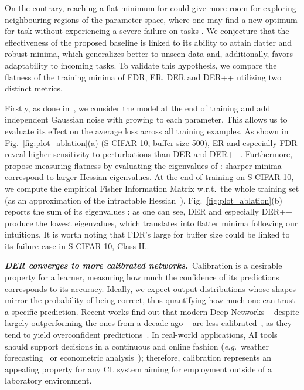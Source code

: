 \documentclass{article}
\begin{document}
On the contrary, reaching a flat minimum for  could give more room for exploring neighbouring regions of the parameter space, where one may find a new optimum for task  without experiencing a severe failure on tasks . We conjecture that the effectiveness of the proposed baseline is linked to its ability to attain flatter and robust minima, which generalizes better to unseen data and, additionally, favors adaptability to incoming tasks. To validate this hypothesis, we compare the flatness of the training minima of FDR, ER, DER and DER++ utilizing two distinct metrics.

Firstly, as done in~\cite{zhang2019your, zhang2018deep}, we consider the model at the end of training and add independent Gaussian noise with growing  to each parameter. This allows us to evaluate its effect on the average loss across all training examples. As shown in Fig.~\ref{fig:plot_ablation}(a) (S-CIFAR-10, buffer size 500), ER and especially FDR reveal higher sensitivity to perturbations than DER and DER++.
Furthermore, \cite{chaudhari2017entropy, jastrzkebski2018three, keskar2017large} propose measuring flatness by evaluating the eigenvalues of : sharper minima correspond to larger Hessian eigenvalues. At the end of training on S-CIFAR-10, we compute the empirical Fisher Information Matrix  w.r.t.\ the whole training set (as an approximation of the intractable Hessian~\cite{chaudhari2017entropy, kirkpatrick2017overcoming}). Fig.~\ref{fig:plot_ablation}(b) reports the sum of its eigenvalues : as one can see, DER and especially DER++ produce the lowest eigenvalues, which translates into flatter minima following our intuitions. It is worth noting that FDR's large  for buffer size  could be linked to its failure case in S-CIFAR-10, Class-IL.

\textbf{\textit{DER converges to more calibrated networks.}}~Calibration is a desirable property for a learner, measuring how much the confidence of its predictions corresponds to its accuracy. Ideally, we expect output distributions whose shapes mirror the probability of being correct, thus quantifying how much one can trust a specific prediction. Recent works find out that modern Deep Networks -- despite largely outperforming the ones from a decade ago -- are less calibrated~\cite{guo2017calibration}, as they tend to yield overconfident predictions~\cite{kull2019beyond}. In real-world applications, AI tools should support decisions in a continuous and online fashion (\textit{e.g.}\ weather forecasting~\cite{brocker2009reliability} or econometric analysis~\cite{gneiting2007probabilistic}); therefore, calibration represents an appealing property for any CL system aiming for employment outside of a laboratory environment.  
\end{document}
